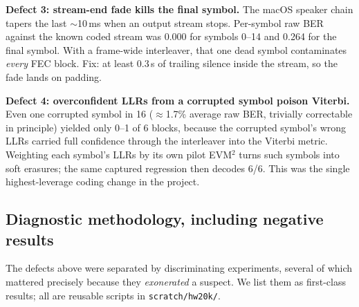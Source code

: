 \documentclass[11pt]{article}
\begin{document}
\textbf{Defect 3: stream-end fade kills the final symbol.}
The macOS speaker chain tapers the last $\sim$10\,ms when an output stream
stops. Per-symbol raw BER against the known coded stream was 0.000 for
symbols 0--14 and 0.264 for the final symbol. With a frame-wide interleaver,
that one dead symbol contaminates \emph{every} FEC block. Fix: at least 0.3\,s
of trailing silence inside the stream, so the fade lands on padding.

\textbf{Defect 4: overconfident LLRs from a corrupted symbol poison Viterbi.}
Even one corrupted symbol in 16 ($\approx$1.7\% average raw BER, trivially
correctable in principle) yielded only 0--1 of 6 blocks, because the corrupted
symbol's wrong LLRs carried full confidence through the interleaver into the
Viterbi metric. Weighting each symbol's LLRs by its own pilot EVM$^2$ turns
such symbols into soft erasures; the same captured regression then decodes
6/6. This was the single highest-leverage coding change in the project.

\subsection{Diagnostic methodology, including negative results}

The defects above were separated by discriminating experiments, several of
which mattered precisely because they \emph{exonerated} a suspect. We list
them as first-class results; all are reusable scripts in
\texttt{scratch/hw20k/}.
\end{document}
